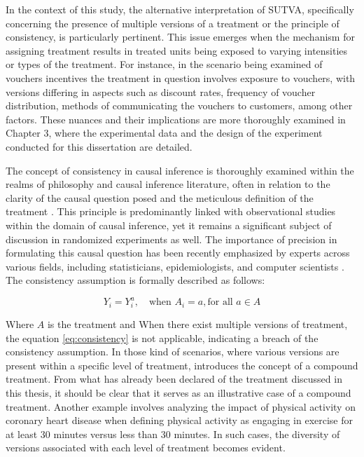In the context of this study, the alternative interpretation of \gls{SUTVA}, specifically concerning the presence of multiple versions of a treatment or the principle of consistency, is particularly pertinent. This issue emerges when the mechanism for assigning treatment results in treated units being exposed to varying intensities or types of the treatment.
For instance, in the scenario being examined of vouchers incentives the treatment in question involves exposure to vouchers, with versions differing in aspects such as discount rates, frequency of voucher distribution, methods of communicating the vouchers to customers, among other factors. These nuances and their implications are more thoroughly examined in Chapter 3,
where the experimental data and the design of the experiment conducted for this dissertation are detailed.

The concept of consistency in causal inference is thoroughly examined within the realms of philosophy and causal inference literature, often in relation to the clarity of the causal question posed and the meticulous definition of the treatment \parencite{hernanCompoundTreatmentsTransportability2011}. This principle is predominantly linked with observational studies within 
the domain of causal inference, yet it remains a significant subject of discussion in randomized experiments as well. The importance of precision in formulating this causal question has been recently emphasized by experts across various fields, including statisticians, epidemiologists, and computer scientists \parencite{pearl_consistency_2010, hernan_does_2008, coleConsistencyStatementCausal2009}.
The consistency assumption is formally described as follows:

\begin{equation}
  Y_i = Y_i^a, \quad  \text{when }  A_i = a, \text{for all }  a \in A
  \label{eq:consistency}
\end{equation}

Where $A$ is the treatment and When there exist multiple versions of treatment, the equation \ref{eq:consistency} is not applicable, indicating a breach of the consistency assumption. In those kind of scenarios, where various versions are present within a specific level of treatment, \textcite{hernanCompoundTreatmentsTransportability2011} introduces the concept of a compound treatment. From what has already been declared 
of the treatment discussed in this thesis, it should be clear that it serves as an illustrative case of a compound treatment. Another example involves analyzing the impact of physical activity on coronary heart disease when defining physical activity as engaging in exercise for at least 30 minutes versus less than 30 minutes. In such cases, the diversity of versions associated with each level of
treatment becomes evident.

